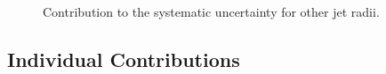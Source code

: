 \begin{figure}[h!]
    \centering
    \qquad
    \\
    \qquad
    \caption{Contribution to the systematic uncertainty for other jet radii.}
    \label{fig:TotalSysOtherR}
\end{figure}

\newpage

\subsection{Individual Contributions}
\label{subsec:appendixIndividualSystematics}

